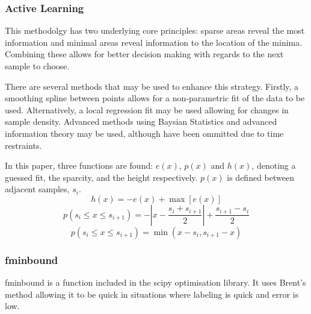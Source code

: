 \subsubsection{Active Learning}
This methodolgy has two underlying core principles: sparse areas reveal the most information and minimal areas reveal information to the location of the minima. Combining these allows for better decision making with regards to the next sample to choose.

There are several methods that may be used to enhance this strategy. Firstly, a smoothing spline between points allows for a non-parametric fit of the data to be used. Alternatively, a local regression fit may be used allowing for changes in sample density. Advanced methods using Baysian Statistics and advanced information theory may be used, although have been ommitted due to time restraints.

In this paper, three functions are found: $e(x)$, $p(x)$ and $h(x)$, denoting a guessed fit, the sparcity, and the height respectively. $p(x)$ is defined between adjacent samples, $s_i$.
\begin{equation}
  {h(x)=-e(x)+\max[e(x)]}
\end{equation}
\begin{equation}
  p(s_i \le x \le s_{i+1})=-\left|x-\frac{s_i+s_{i+1}}{2}\right|+\frac{s_{i+1}-s_{i}}{2}
\end{equation}
\begin{equation}
  p(s_i \le x \le s_{i+1})=\min(x-s_i, s_{i+1}-x)
\end{equation}
\subsubsection{fminbound}
fminbound is a function included in the scipy optimisation library. It uses Brent's method allowing it to be quick in situations where labeling is quick and error is low.

